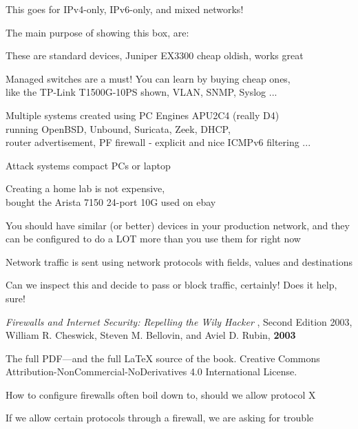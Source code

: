 \documentclass[Screen16to9,17pt]{foils}
\begin{document}
\centerline{This goes for IPv4-only, IPv6-only, and mixed networks!}





The main purpose of showing this box, are:
\begin{list2}
\item These are standard devices, Juniper EX3300 cheap oldish, works great
\item Managed switches are a must! You can learn by buying cheap ones,\\
like the TP-Link T1500G-10PS  shown, VLAN, SNMP, Syslog ...
\item Multiple systems created using PC Engines APU2C4 (really D4)\\
running OpenBSD, Unbound, Suricata, Zeek, DHCP, \\
router advertisement, PF firewall - explicit and nice ICMPv6 filtering ...
\item Attack systems compact PCs or laptop
\item Creating a home lab is not expensive, \\
bought the Arista 7150 24-port 10G used on ebay
\end{list2}

You should have similar (or better) devices in your production network, and they can be
configured to do a LOT more than you use them for right now




\begin{list2}
\item Network traffic is sent using network protocols with fields, values and destinations
\item Can we inspect this and decide to pass or block traffic, certainly! Does it help, sure!
\end{list2}



\begin{list2}
\item \emph{Firewalls and Internet Security: Repelling the Wily Hacker} , Second Edition 2003, William R. Cheswick, Steven M. Bellovin, and Aviel D. Rubin, {\bf 2003} 
\item The full PDF—and the full LaTeX source of the book.
Creative Commons Attribution-NonCommercial-NoDerivatives 4.0 International License.
\item How to configure firewalls often boil down to, should we allow protocol X
\item If we allow certain protocols through a firewall, we are asking for trouble
\end{list2}
\end{document}
